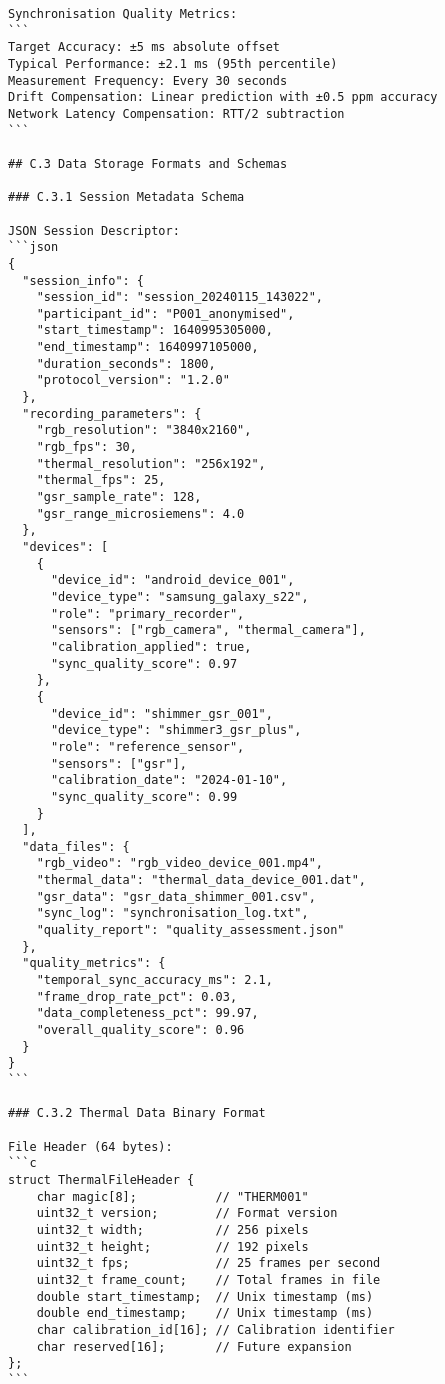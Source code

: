 \begin{verbatim}
Synchronisation Quality Metrics:
```
Target Accuracy: ±5 ms absolute offset
Typical Performance: ±2.1 ms (95th percentile)
Measurement Frequency: Every 30 seconds
Drift Compensation: Linear prediction with ±0.5 ppm accuracy
Network Latency Compensation: RTT/2 subtraction
```

## C.3 Data Storage Formats and Schemas

### C.3.1 Session Metadata Schema

JSON Session Descriptor:
```json
{
  "session_info": {
    "session_id": "session_20240115_143022",
    "participant_id": "P001_anonymised",
    "start_timestamp": 1640995305000,
    "end_timestamp": 1640997105000,
    "duration_seconds": 1800,
    "protocol_version": "1.2.0"
  },
  "recording_parameters": {
    "rgb_resolution": "3840x2160",
    "rgb_fps": 30,
    "thermal_resolution": "256x192",
    "thermal_fps": 25,
    "gsr_sample_rate": 128,
    "gsr_range_microsiemens": 4.0
  },
  "devices": [
    {
      "device_id": "android_device_001",
      "device_type": "samsung_galaxy_s22",
      "role": "primary_recorder",
      "sensors": ["rgb_camera", "thermal_camera"],
      "calibration_applied": true,
      "sync_quality_score": 0.97
    },
    {
      "device_id": "shimmer_gsr_001",
      "device_type": "shimmer3_gsr_plus",
      "role": "reference_sensor",
      "sensors": ["gsr"],
      "calibration_date": "2024-01-10",
      "sync_quality_score": 0.99
    }
  ],
  "data_files": {
    "rgb_video": "rgb_video_device_001.mp4",
    "thermal_data": "thermal_data_device_001.dat",
    "gsr_data": "gsr_data_shimmer_001.csv",
    "sync_log": "synchronisation_log.txt",
    "quality_report": "quality_assessment.json"
  },
  "quality_metrics": {
    "temporal_sync_accuracy_ms": 2.1,
    "frame_drop_rate_pct": 0.03,
    "data_completeness_pct": 99.97,
    "overall_quality_score": 0.96
  }
}
```

### C.3.2 Thermal Data Binary Format

File Header (64 bytes):
```c
struct ThermalFileHeader {
    char magic[8];           // "THERM001"
    uint32_t version;        // Format version
    uint32_t width;          // 256 pixels
    uint32_t height;         // 192 pixels
    uint32_t fps;            // 25 frames per second
    uint32_t frame_count;    // Total frames in file
    double start_timestamp;  // Unix timestamp (ms)
    double end_timestamp;    // Unix timestamp (ms)
    char calibration_id[16]; // Calibration identifier
    char reserved[16];       // Future expansion
};
```


\end{verbatim}
